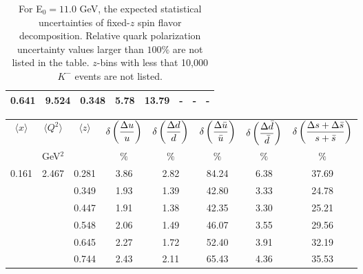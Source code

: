 \begin{table}[htbp]
\begin{center}
\begin{tabular}{|ccc||ccccc|}
   0.641 &   9.524 &   0.348 &         5.78 &        13.79 &            - &            - &            - \\
\hline
\end{tabular}
\end{center}
\caption{\label{tab:purity1}  For E$_0=11.0 $ GeV,
the expected statistical uncertainties of  fixed-$z$ spin flavor decomposition.  Relative quark polarization  uncertainty values larger than $100 \%$ are not listed in the table.  $z$-bins with less that 10,000 $K^-$ events are not listed.
}
\end{table}
%
%
\begin{table}[htbp]
\begin{center}
\begin{tabular}{|ccc||ccccc|}
\hline
$\langle x \rangle $   & $ \langle Q^2 \rangle $   &  $\langle z \rangle$ & $\displaystyle{\delta \left({ \Delta u \over u} \right)}$  & $\displaystyle{\delta \left({ \Delta d \over d} \right)}$&
$\displaystyle{ \delta \left({ \Delta \bar{u} \over\bar{u}} \right)}$ & $\displaystyle{\delta \left({ \Delta \bar{d} \over\bar{d}} \right)}$ &  $\displaystyle{\delta \left({ \Delta s + \Delta  \bar{s} \over s+ \bar{s}} \right)}$  \\
                       & GeV$^2$              &        &  $\%$  &   $\%$    &  $\%$    &     $\%$    &       $\%$                                                   \\ \hline 
   0.161 &   2.467 &   0.281 &         3.86 &         2.82 &        84.24 &         6.38 &        37.69 \\
         &          &    0.349 &         1.93 &         1.39 &        42.80 &         3.33 &        24.78 \\
         &          &    0.447 &         1.91 &         1.38 &        42.35 &         3.30 &        25.21 \\
         &          &    0.548 &         2.06 &         1.49 &        46.07 &         3.55 &        29.56 \\
         &          &    0.645 &         2.27 &         1.72 &        52.40 &         3.91 &        32.19 \\
         &          &    0.744 &         2.43 &         2.11 &        65.43 &         4.36 &        35.53 \\

\end{tabular}
\end{center}
\end{table}
